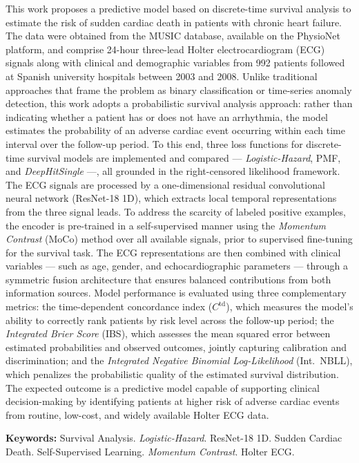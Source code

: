 This work proposes a predictive model based on discrete-time survival analysis to estimate the risk of sudden cardiac death in patients with chronic heart failure. The data were obtained from the MUSIC database, available on the PhysioNet platform, and comprise 24-hour three-lead Holter electrocardiogram (ECG) signals along with clinical and demographic variables from 992 patients followed at Spanish university hospitals between 2003 and 2008. Unlike traditional approaches that frame the problem as binary classification or time-series anomaly detection, this work adopts a probabilistic survival analysis approach: rather than indicating whether a patient has or does not have an arrhythmia, the model estimates the probability of an adverse cardiac event occurring within each time interval over the follow-up period. To this end, three loss functions for discrete-time survival models are implemented and compared --- \textit{Logistic-Hazard}, PMF, and \textit{DeepHitSingle} ---, all grounded in the right-censored likelihood framework. The ECG signals are processed by a one-dimensional residual convolutional neural network (ResNet-18 1D), which extracts local temporal representations from the three signal leads. To address the scarcity of labeled positive examples, the encoder is pre-trained in a self-supervised manner using the \textit{Momentum Contrast} (MoCo) method over all available signals, prior to supervised fine-tuning for the survival task. The ECG representations are then combined with clinical variables --- such as age, gender, and echocardiographic parameters --- through a symmetric fusion architecture that ensures balanced contributions from both information sources. Model performance is evaluated using three complementary metrics: the time-dependent concordance index ($C^{\mathrm{td}}$), which measures the model's ability to correctly rank patients by risk level across the follow-up period; the \textit{Integrated Brier Score} (IBS), which assesses the mean squared error between estimated probabilities and observed outcomes, jointly capturing calibration and discrimination; and the \textit{Integrated Negative Binomial Log-Likelihood} (Int.\ NBLL), which penalizes the probabilistic quality of the estimated survival distribution. The expected outcome is a predictive model capable of supporting clinical decision-making by identifying patients at higher risk of adverse cardiac events from routine, low-cost, and widely available Holter ECG data.

\textbf{Keywords:} Survival Analysis. \textit{Logistic-Hazard}. ResNet-18 1D. Sudden Cardiac Death. Self-Supervised Learning. \textit{Momentum Contrast}. Holter ECG.